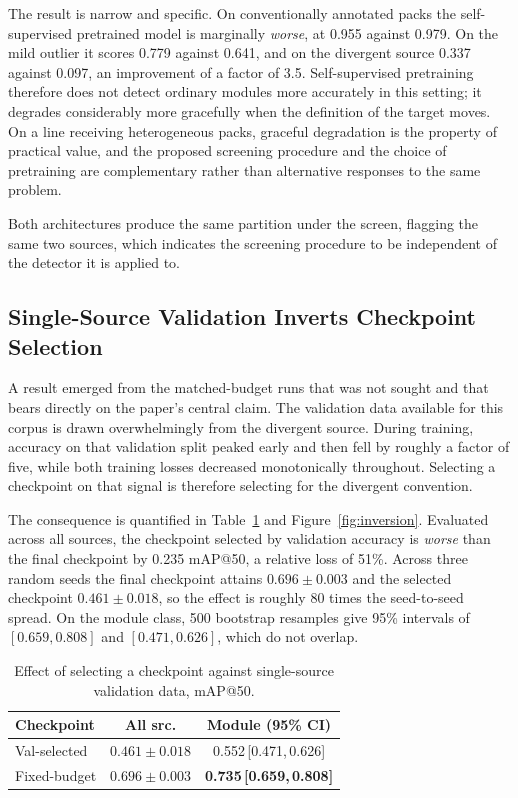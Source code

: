 The result is narrow and specific. On conventionally annotated packs the
self-supervised pretrained model is marginally \emph{worse}, at 0.955 against 0.979.
On the mild outlier it scores 0.779 against 0.641, and on the divergent source 0.337
against 0.097, an improvement of a factor of 3.5. Self-supervised pretraining
therefore does not detect ordinary modules more accurately in this setting; it
degrades considerably more gracefully when the definition of the target moves. On a
line receiving heterogeneous packs, graceful degradation is the property of practical
value, and the proposed screening procedure and the choice of pretraining are
complementary rather than alternative responses to the same problem.

Both architectures produce the same partition under the screen, flagging the same two
sources, which indicates the screening procedure to be independent of the detector it
is applied to.

\subsection{Single-Source Validation Inverts Checkpoint Selection}
\label{sec:res-inversion}

\noindent A result emerged from the matched-budget runs that was not sought and that
bears directly on the paper's central claim. The validation data available for this
corpus is drawn overwhelmingly from the divergent source. During training, accuracy on
that validation split peaked early and then fell by roughly a factor of five, while
both training losses decreased monotonically throughout. Selecting a checkpoint on
that signal is therefore selecting for the divergent convention.

The consequence is quantified in Table~\ref{tab:inversion} and
Figure~\ref{fig:inversion}. Evaluated across all sources, the checkpoint selected by
validation accuracy is \emph{worse} than the final checkpoint by 0.235 mAP@50, a
relative loss of 51\%. Across three random seeds the final checkpoint attains
$0.696 \pm 0.003$ and the selected checkpoint $0.461 \pm 0.018$, so the effect is roughly 80
times the seed-to-seed spread. On the module class, 500 bootstrap resamples give
95\% intervals of $[0.659, 0.808]$ and $[0.471, 0.626]$, which do not overlap.

\begin{table}[t]
\caption{Effect of selecting a checkpoint against single-source validation data, mAP@50.}
\label{tab:inversion}
\centering\small
\setlength{\tabcolsep}{3.5pt}
\begin{tabular}{lcc}
\hline
Checkpoint & All src. & Module (95\% CI) \\
\hline
Val-selected & $0.461 \pm 0.018$ & 0.552\,[0.471,\,0.626] \\
Fixed-budget & $\mathbf{0.696 \pm 0.003}$ & \textbf{0.735\,[0.659,\,0.808]} \\
\hline
\end{tabular}
\end{table}

